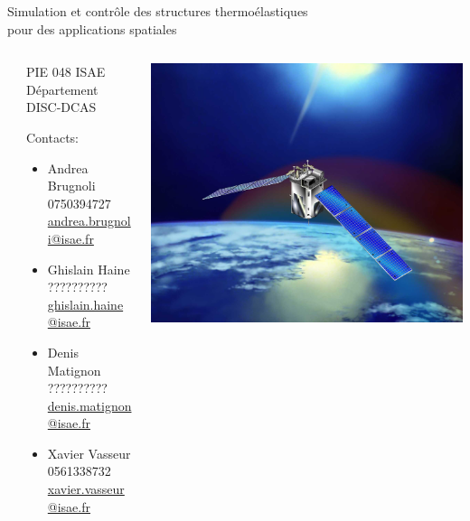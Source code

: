 \documentclass[final]{beamer}
\newlength{\sepwid}
\begin{document}
\begin{frame}[t]{\LARGE \hspace{13cm}
Simulation et contrôle des structures thermoélastiques \\ \hspace{13cm} pour des applications spatiales
} %

\begin{columns} 
\begin{column}{\sepwid}\end{column} %

\begin{column}{0.45\textwidth} %
	
\begin{block}{\center PIE 048 \vspace{1cc}}
ISAE Département DISC-DCAS 

Contacts:
\begin{itemize}
\item Andrea Brugnoli \hspace{.5cm} 0750394727 \hspace{.5cm} \href{mailto:andrea.brugnoli@isae.fr}{andrea.brugnoli@isae.fr}
\item Ghislain Haine \hspace{.5cm} ?????????? \hspace{.5cm} \href{mailto:ghislain.haine@isae.fr}{ghislain.haine@isae.fr}
\item Denis Matignon \hspace{.5cm} ?????????? \hspace{.5cm} \href{mailto:denis.matignon@isae.fr}{denis.matignon@isae.fr}
\item Xavier Vasseur \hspace{.5cm} 0561338732 \hspace{.5cm} \href{mailto:xavier.vasseur@isae.fr}{xavier.vasseur@isae.fr}
\end{itemize}

\end{block}

\end{column} 

\begin{column}{0.5\textwidth} %
	\centering
	\includegraphics[width=0.75\columnwidth]{satellite.jpg}
\end{column} 


\end{columns}
\end{frame}
\end{document}
